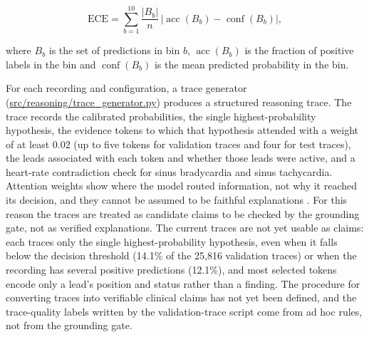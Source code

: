 \[
\text{ECE} = \sum_{b=1}^{10} \frac{|B_b|}{n}\,\bigl|\operatorname{acc}(B_b) - \operatorname{conf}(B_b)\bigr|,
\]

where $B_b$ is the set of predictions in bin $b$, $\operatorname{acc}(B_b)$ is the fraction of positive labels in the bin and $\operatorname{conf}(B_b)$ is the mean predicted probability in the bin.

For each recording and configuration, a trace generator (\url{src/reasoning/trace_generator.py}) produces a structured reasoning trace. The trace records the calibrated probabilities, the single highest-probability hypothesis, the evidence tokens to which that hypothesis attended with a weight of at least 0.02 (up to five tokens for validation traces and four for test traces), the leads associated with each token and whether those leads were active, and a heart-rate contradiction check for sinus bradycardia and sinus tachycardia. Attention weights show where the model routed information, not why it reached its decision, and they cannot be assumed to be faithful explanations \cite{JAIN2019ATTENTION}. For this reason the traces are treated as candidate claims to be checked by the grounding gate, not as verified explanations. The current traces are not yet usable as claims: each traces only the single highest-probability hypothesis, even when it falls below the decision threshold (14.1\% of the 25,816 validation traces) or when the recording has several positive predictions (12.1\%), and most selected tokens encode only a lead's position and status rather than a finding. The procedure for converting traces into verifiable clinical claims has not yet been defined, and the trace-quality labels written by the validation-trace script come from ad hoc rules, not from the grounding gate.

